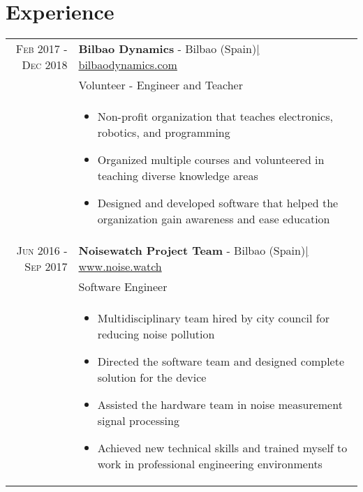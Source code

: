\documentclass[a4paper,10pt]{article}
\begin{document}
\vspace{-.1in}

\section{Experience}
\begin{tabular}{rp{13.3cm}}

 \textsc{Feb 2017 - Dec 2018}& \textbf{Bilbao Dynamics} - Bilbao (Spain)\href{https://bilbaodynamics.com/}{\hfill | \footnotesize bilbaodynamics.com}\\
 & Volunteer - Engineer and Teacher \\ 
 & \footnotesize{ \begin{itemize}[noitemsep,topsep=3pt]
 \vspace{-0.1in}
 \item Non-profit organization that teaches electronics, robotics, and programming
 \item Organized multiple courses and volunteered in teaching diverse knowledge areas
 \item Designed and developed software that helped the organization gain awareness and ease education

 \end{itemize}} \\

 \textsc{Jun 2016 - Sep 2017}& \textbf{Noisewatch Project Team} - Bilbao (Spain)\href{http://noise.watch}{\hfill | \footnotesize www.noise.watch}\\
 & Software Engineer \\
 & \footnotesize{ \begin{itemize}[noitemsep,topsep=3pt]
 \vspace{-0.1in}
 \item Multidisciplinary team hired by city council for reducing noise pollution
 \item Directed the software team and designed complete solution for the device
 \item Assisted the hardware team in noise measurement signal processing
 \item Achieved new technical skills and trained myself to work in professional engineering environments
 \end{itemize}} \\


\end{tabular}
\end{document}
